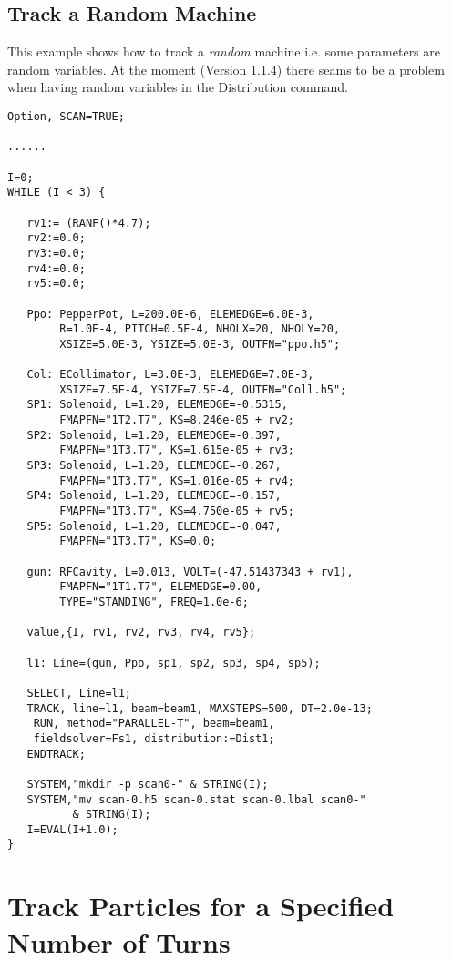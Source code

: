 \subsection{Track a Random Machine} \label{sec:randmach}
This example shows how to track a {\em random} machine i.e. some
parameters are random variables. At the moment (Version 1.1.4) there seams to be a problem when 
having random variables in the Distribution command.
\begin{verbatim}
Option, SCAN=TRUE;

...... 

I=0;
WHILE (I < 3) {

   rv1:= (RANF()*4.7);
   rv2:=0.0; 
   rv3:=0.0; 
   rv4:=0.0; 
   rv5:=0.0; 

   Ppo: PepperPot, L=200.0E-6, ELEMEDGE=6.0E-3, 
        R=1.0E-4, PITCH=0.5E-4, NHOLX=20, NHOLY=20, 
        XSIZE=5.0E-3, YSIZE=5.0E-3, OUTFN="ppo.h5";

   Col: ECollimator, L=3.0E-3, ELEMEDGE=7.0E-3, 
        XSIZE=7.5E-4, YSIZE=7.5E-4, OUTFN="Coll.h5";
   SP1: Solenoid, L=1.20, ELEMEDGE=-0.5315, 
        FMAPFN="1T2.T7", KS=8.246e-05 + rv2;
   SP2: Solenoid, L=1.20, ELEMEDGE=-0.397,  
        FMAPFN="1T3.T7", KS=1.615e-05 + rv3;
   SP3: Solenoid, L=1.20, ELEMEDGE=-0.267,  
        FMAPFN="1T3.T7", KS=1.016e-05 + rv4;
   SP4: Solenoid, L=1.20, ELEMEDGE=-0.157, 
        FMAPFN="1T3.T7", KS=4.750e-05 + rv5;
   SP5: Solenoid, L=1.20, ELEMEDGE=-0.047,  
        FMAPFN="1T3.T7", KS=0.0;

   gun: RFCavity, L=0.013, VOLT=(-47.51437343 + rv1), 
        FMAPFN="1T1.T7", ELEMEDGE=0.00, 
        TYPE="STANDING", FREQ=1.0e-6;

   value,{I, rv1, rv2, rv3, rv4, rv5};

   l1: Line=(gun, Ppo, sp1, sp2, sp3, sp4, sp5); 

   SELECT, Line=l1;
   TRACK, line=l1, beam=beam1, MAXSTEPS=500, DT=2.0e-13;
    RUN, method="PARALLEL-T", beam=beam1, 
    fieldsolver=Fs1, distribution:=Dist1;
   ENDTRACK;

   SYSTEM,"mkdir -p scan0-" & STRING(I);
   SYSTEM,"mv scan-0.h5 scan-0.stat scan-0.lbal scan0-"
          & STRING(I);
   I=EVAL(I+1.0);
}
\end{verbatim}

\section{Track Particles for a Specified Number of Turns}
\label{sec:trackrun}

